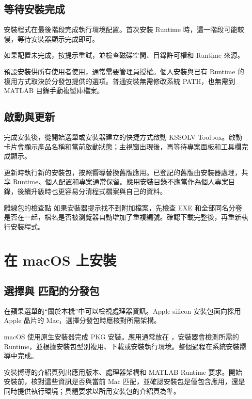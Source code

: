 \subsection{等待安裝完成}

安裝程式在最後階段完成執行環境配置。首次安裝 Runtime 時，這一階段可能較慢，等待安裝器顯示完成即可。

如果配置未完成，按提示重試，並檢查磁碟空間、目錄許可權和 Runtime 來源。

預設安裝供所有使用者使用，通常需要管理員授權。個人安裝與已有 Runtime 的複用方式取決於分發包提供的選項。普通安裝無需修改系統 PATH，也無需到 MATLAB\regmark{} 目錄手動複製庫檔案。

\subsection{啟動與更新}

完成安裝後，從開始選單或安裝器建立的快捷方式啟動 KSSOLV Toolbox。啟動卡片會顯示產品名稱和當前啟動狀態；主視窗出現後，再等待專案面板和工具欄完成顯示。

更新時執行新的安裝包，按照嚮導替換舊版應用。已登記的舊版由安裝器處理，共享 Runtime、個人配置和專案通常保留。應用安裝目錄不應當作為個人專案目錄，後續升級時也更容易分清程式檔案與自己的資料。

\begin{notebox}{離線包的檢查點}
如果安裝器提示找不到附加檔案，先檢查 EXE 和全部同名分卷是否在一起，檔名是否被瀏覽器自動增加了重複編號。確認下載完整後，再重新執行安裝程式。
\end{notebox}

\section{在 macOS 上安裝}

\subsection{選擇與  匹配的分發包}

在蘋果選單的“關於本機”中可以檢視處理器資訊。Apple silicon 安裝包面向採用 Apple 晶片的 Mac，選擇分發包時應核對所需架構。

macOS 使用原生安裝器完成 PKG 安裝。應用通常放在 ，安裝器會檢測所需的 Runtime，並根據安裝包型別複用、下載或安裝執行環境。整個過程在系統安裝嚮導中完成。

安裝嚮導的介紹頁列出應用版本、處理器架構和 MATLAB\regmark{} Runtime 要求。開始安裝前，核對這些資訊是否與當前 Mac 匹配，並確認安裝包是僅包含應用，還是同時提供執行環境；具體要求以所用安裝包的介紹頁為準。

